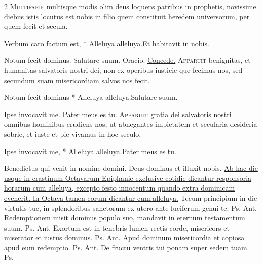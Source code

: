 \begin{multicols*}{2}
\lettrine[lines=2]{\zallmancaps \color{Red} M}{ultifarie} multisque modis olim deus loquens patribus in prophetis, novissime diebus istis locutus est nobis in filio quem constituit heredem universorum, per quem fecit et secula.
\begin{responsory-breve}
{Verbum caro factum est, * Alleluya alleluya.}{Et habitavit in nobis.}
\end{responsory-breve}%
\V Notum fecit dominus. \R Salutare suum. {\color{Red} Oracio.} \hyperlink{concede-nativitas}{Concede.}
\lettrine[lines=2]{\zallmancaps \color{Blue} A}{pparuit} benignitas, et humanitas salvatoris nostri dei, non ex operibus iusticie que fecimus nos, sed secundum suam misericordiam salvos nos fecit.
\begin{responsory-breve}
{Notum fecit dominus * Alleluya alleluya.}{Salutare suum.}
\end{responsory-breve}%
\V Ipse invocavit me. \R Pater meus es tu.
\lettrine[lines=2]{\zallmancaps \color{Red} A}{pparuit} gratia dei salvatoris nostri omnibus hominibus erudiens nos, ut abnegantes impietatem et secularia desideria sobrie, et iuste et pie vivamus in hoc seculo.
\begin{responsory-breve}
{Ipse invocavit me, * Alleluya alleluya.}{Pater meus es tu.}
\end{responsory-breve}%
\V Benedictus qui venit in nomine domini. \R Deus dominus et illuxit nobis.
\newline \ul{Ab hac die usque in crastinum Octavarum Epiphanie exclusive cotidie dicantur responsoria horarum cum alleluya, excepto festo innocentum quando extra dominicam evenerit. In Octava tamen eorum dicantur cum alleluya.}
 Tecum principium in die virtutis tue, in splendoribus sanctorum ex utero ante luciferum genui te. {\color{Red} Ps.}  {\color{Red} Ant.} Redemptionem misit dominus populo suo, mandavit in eternum testamentum suum. {\color{Red} Ps.}  {\color{Red} Ant.} Exortum est in tenebris lumen rectis corde, misericors et miserator et iustus dominus. {\color{Red} Ps.}  {\color{Red} Ant.} Apud dominum misericordia et copiosa apud eum redemptio. {\color{Red} Ps.}  {\color{Red} Ant.} De fructu ventris tui ponam super sedem tuam. {\color{Red} Ps.} 

\end{multicols*}
